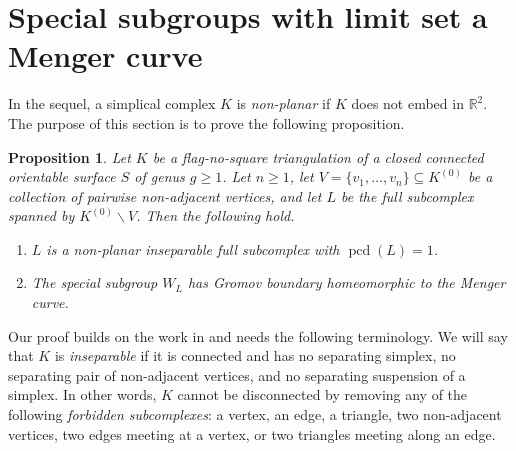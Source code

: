 \documentclass{amsart}
\theoremstyle{plain}
\newtheorem{proposition}[theorem]{Proposition}
\theoremstyle{definition}
\theoremstyle{remark}
\numberwithin{equation}{section}
\newcommand{\rr}{\mathbb R}
\newcommand{\pcd}{\operatorname{pcd}}
\renewcommand{\geq}{\geqslant}
\renewcommand{\setminus}{\smallsetminus}
\begin{document}

\section{Special subgroups with limit set a Menger curve}\label{sec:menger}

In the sequel, a simplical complex $K$ is \textit{non-planar} if $K$ does not embed in $\rr^2$. 
The purpose of this section is to prove the following proposition.

\begin{proposition}\label{prop:menger_surface}
    Let $K$ be a flag-no-square triangulation  of a  closed connected orientable surface $S$ of genus $g\geq 1$.
    Let $n\geq 1$, let $V=\{v_1,\dots,v_n\}\subseteq K^{(0)}$ be a collection of pairwise non-adjacent vertices, and let $L$ be the full subcomplex  spanned by $K^{(0)}\setminus V$. 
    Then the following hold.
    \begin{enumerate}
    \item \label{item:menger subcomplex}
    $L$ is a  non-planar inseparable full subcomplex with $\pcd (L)=1$.

    \item \label{item:menger subgroup} The special subgroup $W_L$ has Gromov boundary  homeomorphic to the Menger curve.
    \end{enumerate}
\end{proposition}

Our proof builds on the work in \cite{SW16,DS21,DHW23} and needs the following terminology.
We will say that $K$ is \textit{inseparable} if it is connected and has no separating simplex, no separating pair of non-adjacent vertices, and no separating suspension of a simplex. 
In other words, $K$ cannot be disconnected by removing any of the following \textit{forbidden subcomplexes}: a vertex, an edge, a triangle, two non-adjacent vertices, two edges meeting at a vertex, or two triangles meeting along an edge.
\end{document}
